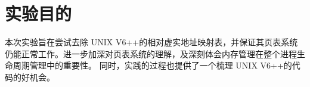 \section{实验目的}
本次实验旨在尝试去除 UNIX V6++的相对虚实地址映射表，并保证其页表系统仍能正常工作。进一步加深对页表系统的理解，及深刻体会内存管理在整个进程生命周期管理中的重要性。
同时，实践的过程也提供了一个梳理 UNIX V6++的代码的好机会。